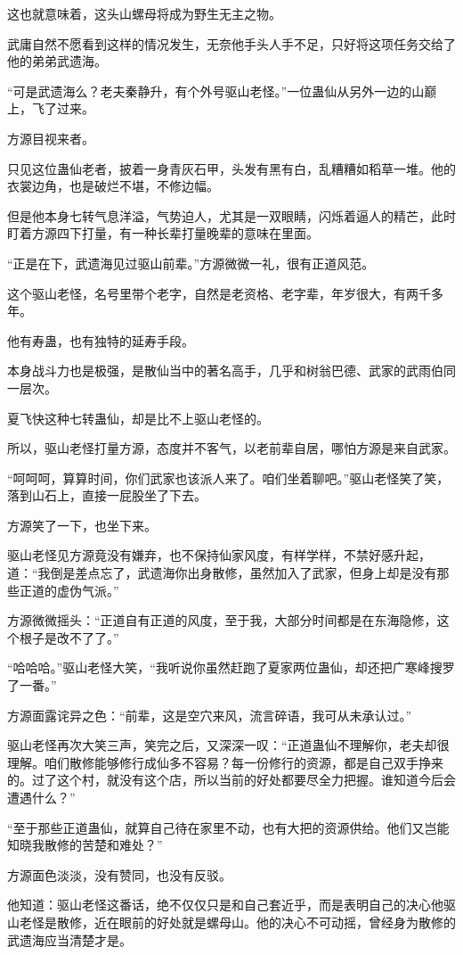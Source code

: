 \begin{this_body}
这也就意味着，这头山螺母将成为野生无主之物。

武庸自然不愿看到这样的情况发生，无奈他手头人手不足，只好将这项任务交给了他的弟弟武遗海。

“可是武遗海么？老夫秦静升，有个外号驱山老怪。”一位蛊仙从另外一边的山巅上，飞了过来。

方源目视来者。

只见这位蛊仙老者，披着一身青灰石甲，头发有黑有白，乱糟糟如稻草一堆。他的衣裳边角，也是破烂不堪，不修边幅。

但是他本身七转气息洋溢，气势迫人，尤其是一双眼睛，闪烁着逼人的精芒，此时盯着方源四下打量，有一种长辈打量晚辈的意味在里面。

“正是在下，武遗海见过驱山前辈。”方源微微一礼，很有正道风范。

这个驱山老怪，名号里带个老字，自然是老资格、老字辈，年岁很大，有两千多年。

他有寿蛊，也有独特的延寿手段。

本身战斗力也是极强，是散仙当中的著名高手，几乎和树翁巴德、武家的武雨伯同一层次。

夏飞快这种七转蛊仙，却是比不上驱山老怪的。

所以，驱山老怪打量方源，态度并不客气，以老前辈自居，哪怕方源是来自武家。

“呵呵呵，算算时间，你们武家也该派人来了。咱们坐着聊吧。”驱山老怪笑了笑，落到山石上，直接一屁股坐了下去。

方源笑了一下，也坐下来。

驱山老怪见方源竟没有嫌弃，也不保持仙家风度，有样学样，不禁好感升起，道：“我倒是差点忘了，武遗海你出身散修，虽然加入了武家，但身上却是没有那些正道的虚伪气派。”

方源微微摇头：“正道自有正道的风度，至于我，大部分时间都是在东海隐修，这个根子是改不了了。”

“哈哈哈。”驱山老怪大笑，“我听说你虽然赶跑了夏家两位蛊仙，却还把广寒峰搜罗了一番。”

方源面露诧异之色：“前辈，这是空穴来风，流言碎语，我可从未承认过。”

驱山老怪再次大笑三声，笑完之后，又深深一叹：“正道蛊仙不理解你，老夫却很理解。咱们散修能够修行成仙多不容易？每一份修行的资源，都是自己双手挣来的。过了这个村，就没有这个店，所以当前的好处都要尽全力把握。谁知道今后会遭遇什么？”

“至于那些正道蛊仙，就算自己待在家里不动，也有大把的资源供给。他们又岂能知晓我散修的苦楚和难处？”

方源面色淡淡，没有赞同，也没有反驳。

他知道：驱山老怪这番话，绝不仅仅只是和自己套近乎，而是表明自己的决心他驱山老怪是散修，近在眼前的好处就是螺母山。他的决心不可动摇，曾经身为散修的武遗海应当清楚才是。


\end{this_body}
